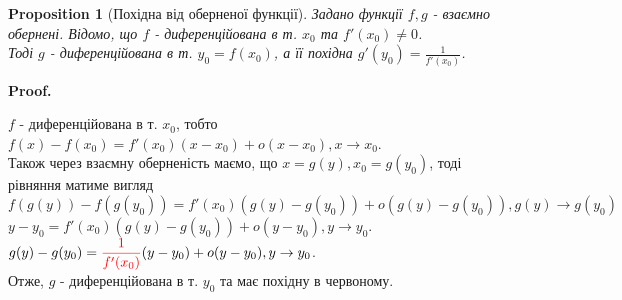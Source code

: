 \documentclass[a4paper, 14pt]{article}
\makeatletter
\def\qed{$\blacksquare$}
\theoremstyle{theoremdd}
\theoremstyle{theoremdd}
\theoremstyle{theoremdd}
\theoremstyle{theoremdd}
\theoremstyle{theoremdd}
\newtheorem{proposition}[theorem]{Proposition}
\theoremstyle{theoremdd}
\theoremstyle{theoremdd}
\theoremstyle{theoremdd}
\renewenvironment{proof}[1][Proof.\\]{\par
\pushQED{\hfill \qed}%
\normalfont \topsep6\p@\@plus6\p@\relax
\trivlist
\item\relax
{\bfseries
#1\@addpunct{.}}\hspace\labelsep\ignorespaces
}{%
\popQED\endtrivlist\@endpefalse
}
\makeatother
\begin{document}
\iffalse
\begin{proof}
$h'(x) = \displaystyle \lim_{x \to x_0} \frac{h(x)-h(x_0)}{x-x_0} = \lim_{x \to x_0} \frac{g(f(x))-g(f(x_0))}{x-x_0} = \lim_{x \to x_0} \frac{g(f(x))-g(f(x_0))}{f(x)-f(x_0)} \frac{f(x)-f(x_0)}{x-x_0} \boxed{=}$\\
Розіб'ємо дві дроби на окремі границі. В першому дробі заміна: $y=f(x)$\\
Якщо $x \to x_0$, то в силу диференційованості, а внаслідок - неперервності, $f(x) \to f(x_0)$ або $y \to y_0$.\\
$\boxed{=} \displaystyle \lim_{y \to y_0} \frac{g(y)-g(y_0)}{y-y_0} \lim_{x \to x_0} \frac{f(x)-f(x_0)}{x-x_0}= g'(y_0) f'(x_0)=g'(f(x_0))f'(x_0) \\ \Rightarrow h$ - диференційована в т. $x_0$.
\end{proof}
\fi

\begin{proposition}[Похідна від оберненої функції]
Задано функції $f,g$ - взаємно обернені. Відомо, що $f$ - диференційована в т. $x_0$ та $f'(x_0) \neq 0$. \\ Тоді $g$ - диференційована в т. $y_0 = f(x_0)$, а її похідна 
$g'(y_0) = \displaystyle \frac{1}{f'(x_0)}$.
\end{proposition}

\begin{proof}
$f$ - диференційована в т. $x_0$, тобто $f(x)-f(x_0)=f'(x_0)(x-x_0)+o(x-x_0), x \to x_0$.\\
Також через взаємну оберненість маємо, що $x = g(y), x_0 = g(y_0)$, тоді рівняння матиме вигляд\\
$f(g(y))-f(g(y_0)) = f'(x_0)(g(y)-g(y_0)) + o(g(y)-g(y_0)), g(y) \to g(y_0)$\\
$y-y_0 = f'(x_0)(g(y)-g(y_0)) + o(y-y_0), y \to y_0$.\\
$g(y)-g(y_0) = \textcolor{red}{\dfrac{1}{f'(x_0)}}(y-y_0) + o(y-y_0), y \to y_0$.\\
Отже, $g$ - диференційована в т. $y_0$ та має похідну в червоному.
\end{proof}

\iffalse
\begin{proof}
$g'(y_0) = \displaystyle \lim_{y \to y_0} \frac{g(y)-g(y_0)}{y-y_0} \boxed{=}$\\
Заміна: $y = f(x)$. Через взаємну оберненість $g(y)=g(f(x))=x$. Якщо $y \to y_0$, то $g(y) \to g(y_0) \Rightarrow x \to x_0$.\\
$\boxed{=} \displaystyle \lim_{x \to x_0}\frac{x-x_0}{f(x)-f(x_0)} = \frac{1}{f'(x_0)} \\ \Rightarrow g$ - диференційована в т. $y_0$.
\end{proof}
\fi
\end{document}

